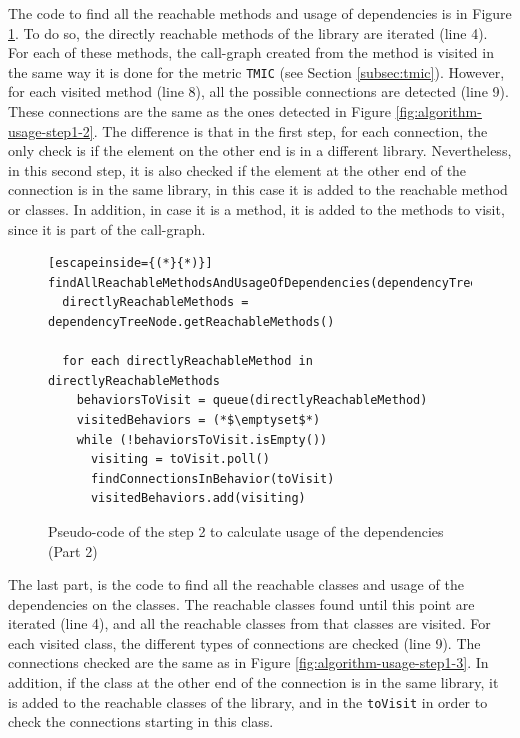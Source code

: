 The code to find all the reachable methods and usage of dependencies is in Figure \ref{fig:algorithm-usage-step2-2}. To do so, the directly reachable methods of the library are iterated (line 4). For each of these methods, the call-graph created from the method is visited in the same way it is done for the metric \texttt{TMIC} (see Section \ref{subsec:tmic}). However, for each visited method (line 8), all the possible connections are detected (line 9). These connections are the same as the ones detected in Figure \ref{fig:algorithm-usage-step1-2}. The difference is that in the first step, for each connection, the only check is if the element on the other end is in a different library. Nevertheless, in this second step, it is also checked if the element at the other end of the connection is in the same library, in this case it is added to the reachable method or classes. In addition, in case it is a method, it is added to the methods to visit, since it is part of the call-graph.

\begin{figure}[ht!]
\begin{lstlisting}[escapeinside={(*}{*)}]
findAllReachableMethodsAndUsageOfDependencies(dependencyTreeNode)
  directlyReachableMethods = dependencyTreeNode.getReachableMethods()

  for each directlyReachableMethod in directlyReachableMethods
    behaviorsToVisit = queue(directlyReachableMethod)
    visitedBehaviors = (*$\emptyset$*)
    while (!behaviorsToVisit.isEmpty())
      visiting = toVisit.poll()
      findConnectionsInBehavior(toVisit)
      visitedBehaviors.add(visiting)
\end{lstlisting}
\caption{Pseudo-code of the step 2 to calculate usage of the dependencies (Part 2)}
\label{fig:algorithm-usage-step2-2}
\end{figure}

The last part, is the code to find all the reachable classes and usage of the dependencies on the classes. The reachable classes found until this point are iterated (line 4), and all the reachable classes from that classes are visited. For each visited class, the different types of connections are checked (line 9). The connections checked are the same as in Figure \ref{fig:algorithm-usage-step1-3}. In addition, if the class at the other end of the connection is in the same library, it is added to the reachable classes of the library, and in the \texttt{toVisit} in order to check the connections starting in this class.

